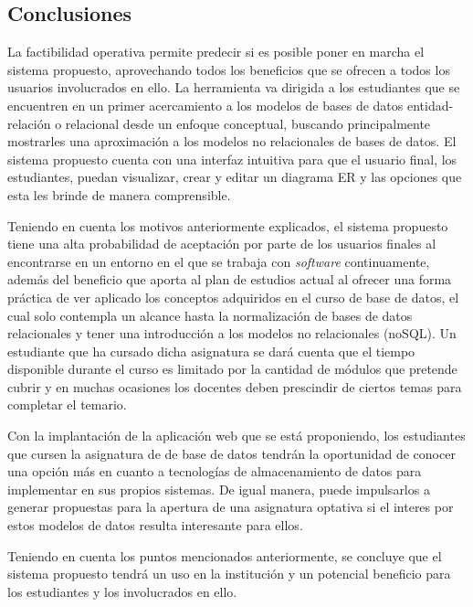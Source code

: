 
\subsection{Conclusiones}


La factibilidad operativa permite predecir si es posible poner en marcha el sistema propuesto, aprovechando todos los beneficios que se ofrecen a todos los usuarios involucrados en ello. La herramienta va dirigida a los estudiantes que se encuentren en un primer acercamiento a los modelos de bases de datos entidad-relación o relacional desde un enfoque conceptual, buscando principalmente mostrarles una aproximación a los modelos no relacionales de bases de datos. El sistema propuesto cuenta con una interfaz intuitiva para que el usuario final, los estudiantes, puedan visualizar, crear y editar un diagrama ER y las opciones que esta les brinde de manera comprensible.


Teniendo en cuenta los motivos anteriormente explicados, el sistema propuesto tiene una alta probabilidad de aceptación por parte de los usuarios finales al encontrarse en un entorno en el que se trabaja con \textit{software} continuamente, además del beneficio que aporta al plan de estudios actual al ofrecer una forma práctica de ver aplicado los conceptos adquiridos en el curso de base de datos, el cual solo contempla un alcance hasta la normalización de bases de datos relacionales y tener una introducción a los modelos no relacionales (noSQL). Un estudiante que ha cursado dicha asignatura se dará cuenta que el tiempo disponible durante el curso es limitado por la cantidad de módulos que pretende cubrir y en muchas ocasiones los docentes deben prescindir de ciertos temas para completar el temario.

Con la implantación de la aplicación web que se está proponiendo, los estudiantes que cursen la asignatura de de base de datos tendrán la oportunidad de conocer una opción más en cuanto a tecnologías de almacenamiento de datos para implementar en sus propios sistemas. De igual manera, puede impulsarlos a generar propuestas para la apertura de una asignatura optativa si el interes por estos modelos de datos resulta interesante para ellos.

Teniendo en cuenta los puntos mencionados anteriormente, se concluye que el sistema propuesto tendrá un uso en la institución y un potencial beneficio para los estudiantes y los involucrados en ello.

